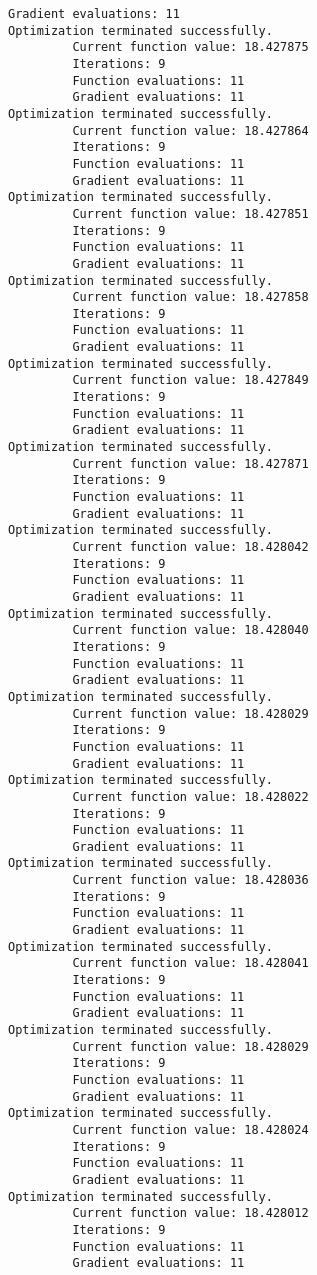 \documentclass[11pt]{article}
\begin{document}
\begin{Verbatim}[commandchars=\\\{\}]
         Gradient evaluations: 11
Optimization terminated successfully.
         Current function value: 18.427875
         Iterations: 9
         Function evaluations: 11
         Gradient evaluations: 11
Optimization terminated successfully.
         Current function value: 18.427864
         Iterations: 9
         Function evaluations: 11
         Gradient evaluations: 11
Optimization terminated successfully.
         Current function value: 18.427851
         Iterations: 9
         Function evaluations: 11
         Gradient evaluations: 11
Optimization terminated successfully.
         Current function value: 18.427858
         Iterations: 9
         Function evaluations: 11
         Gradient evaluations: 11
Optimization terminated successfully.
         Current function value: 18.427849
         Iterations: 9
         Function evaluations: 11
         Gradient evaluations: 11
Optimization terminated successfully.
         Current function value: 18.427871
         Iterations: 9
         Function evaluations: 11
         Gradient evaluations: 11
Optimization terminated successfully.
         Current function value: 18.428042
         Iterations: 9
         Function evaluations: 11
         Gradient evaluations: 11
Optimization terminated successfully.
         Current function value: 18.428040
         Iterations: 9
         Function evaluations: 11
         Gradient evaluations: 11
Optimization terminated successfully.
         Current function value: 18.428029
         Iterations: 9
         Function evaluations: 11
         Gradient evaluations: 11
Optimization terminated successfully.
         Current function value: 18.428022
         Iterations: 9
         Function evaluations: 11
         Gradient evaluations: 11
Optimization terminated successfully.
         Current function value: 18.428036
         Iterations: 9
         Function evaluations: 11
         Gradient evaluations: 11
Optimization terminated successfully.
         Current function value: 18.428041
         Iterations: 9
         Function evaluations: 11
         Gradient evaluations: 11
Optimization terminated successfully.
         Current function value: 18.428029
         Iterations: 9
         Function evaluations: 11
         Gradient evaluations: 11
Optimization terminated successfully.
         Current function value: 18.428024
         Iterations: 9
         Function evaluations: 11
         Gradient evaluations: 11
Optimization terminated successfully.
         Current function value: 18.428012
         Iterations: 9
         Function evaluations: 11
         Gradient evaluations: 11

\end{Verbatim}
\end{document}
